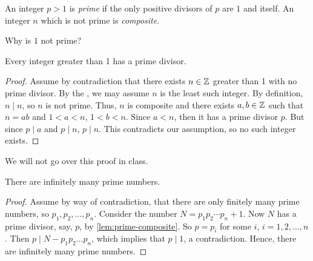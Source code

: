 \documentclass{ximera}
\begin{document}



\begin{defn}\label{defn:prime-composite}
An integer $p>1$ is \emph{prime} if the only positive divisors of $p$ are $1$ and itself. An integer $n$ which is not prime is \emph{composite}. 
\end{defn}

Why is $1$ not prime?


\begin{lemma}\label{lem:prime-composite}
  Every integer greater than 1 has a prime divisor.
  \begin{proof} 
    Assume by contradiction that there exists $n\in\mathbb Z$ greater than 1 with no prime divisor. By the , we may assume $n$ is the least such integer. By definition, $n\mid n$, so $n$ is not prime. Thus, $n$ is composite and there exists $a,b\in\mathbb Z$ such that $n=ab$ and $1<a<n$, $1<b<n$. Since $a<n$, then it has a prime divisor $p$. But since $p\mid a$ and $p\mid n$, $p\mid n$. This contradicts our assumption, so no such integer exists.
  \end{proof}
\end{lemma}

We will not go over this proof in class.




\begin{theorem}\label{thm:inf-primes}
  There are infinitely many prime numbers.

  \begin{proof}
    Assume by way of contradiction, that there are only finitely many prime numbers, so $p_1,p_2,\dots,p_n$. Consider the number $N=p_1p_2\cdots p_n +1$. Now $N$ has a prime divisor, say, $p$, by \cref{lem:prime-composite}. So $p=p_i$ for some $i$, $i=1,2,\dots,n$. Then $p\mid N-p_1p_2\dots p_n$, which implies that $p\mid 1$, a contradiction. Hence, there are infinitely many prime numbers.
  \end{proof}
\end{theorem}
\end{document}

